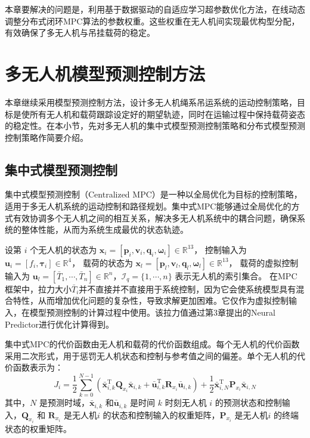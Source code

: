 \documentclass[lang=chs, degree=master, blindreview=false, winfonts=true]{yanputhesis}
\begin{document}
本章要解决的问题是，利用基于数据驱动的自适应学习超参数优化方法，在线动态调整分布式闭环MPC算法的参数权重。这些权重在无人机间实现最优构型分配，有效确保了多无人机与吊挂载荷的稳定。

\section{多无人机模型预测控制方法}
本章继续采用模型预测控制方法，设计多无人机绳系吊运系统的运动控制策略，目标是使所有无人机和载荷跟踪设定好的期望轨迹，同时在运输过程中保持载荷姿态的稳定性。在本小节，先对多无人机的集中式模型预测控制策略和分布式模型预测控制策略作简要介绍。
\subsection{集中式模型预测控制}
集中式模型预测控制（Centralized MPC）是一种以全局优化为目标的控制策略，适用于多无人机系统的运动控制和路径规划。集中式MPC能够通过全局优化的方式有效协调多个无人机之间的相互关系，解决多无人机系统中的耦合问题，确保系统的整体性能，从而为系统生成最优的状态轨迹。


设第 \( i \) 个无人机的状态为 
\(
\bm{x}_i = \left[ \bm{p}_i, \bm{v}_i, \bm{q}_i, \bm{\omega}_i \right] \in \mathbb{R}^{13}
\)，
控制输入为 
\(
\bm{u}_i = \left[ f_i, \bm{\tau}_i \right] \in \mathbb{R}^4
\)，
载荷的状态为 
\(
\bm{x}_l = \left[ \bm{p}_l, \bm{v}_l, \bm{q}_l, \bm{\omega}_l \right] \in \mathbb{R}^{13}
\)，
载荷的虚拟控制输入为 
\(
\bm{u}_l = \left[ \bar{T}_1, \cdots, \bar{T}_n \right] \in \mathbb{R}^n
\)，$\mathcal{I}_q = \{1, \cdots , n\}$ 表示无人机的索引集合。
在MPC框架中，拉力大小$\bar{T}_i$并不直接并不直接用于系统控制，因为它会使系统模型具有混合特性，从而增加优化问题的复杂性，导致求解更加困难。它仅作为虚拟控制输入，在模型预测控制的计算过程中使用。该拉力值通过第3章提出的Neural Predictor进行优化计算得到。

集中式MPC的代价函数由无人机和载荷的代价函数组成。每个无人机的代价函数采用二次形式，用于惩罚无人机状态和控制与参考值之间的偏差。单个无人机的代价函数表示为：
\begin{equation}
	J_i = \frac{1}{2}\sum_{k=0}^{N-1}\left(\bar{\boldsymbol{x}}_{i,k}^\mathrm{T}\boldsymbol{Q}_{x_i}\bar{\boldsymbol{x}}_{i,k}+\bar{\boldsymbol{u}}_{i,k}^\mathrm{T}\boldsymbol{R}_{x_i}\bar{\boldsymbol{u}}_{i,k}\right)+\frac{1}{2}\bar{\boldsymbol{x}}_{i,N}^\mathrm{T}\boldsymbol{P}_{x_i}\bar{\boldsymbol{x}}_{i,N}
	\label{juav}
\end{equation}
其中，$N$ 是预测时域，$\bar{\boldsymbol{x}}_{i,k}$ 和$\bar{\boldsymbol{u}}_{i,k}$ 是时间 $k$ 时刻无人机 $i$ 的预测状态和控制输入，$\boldsymbol{Q}_{x_i}$ 和 $\boldsymbol{R}_{x_i}$ 是无人机$i$ 的状态和控制输入的权重矩阵，$\boldsymbol{P}_{x_i}$ 是无人机$i$ 的终端状态的权重矩阵。
\end{document}
